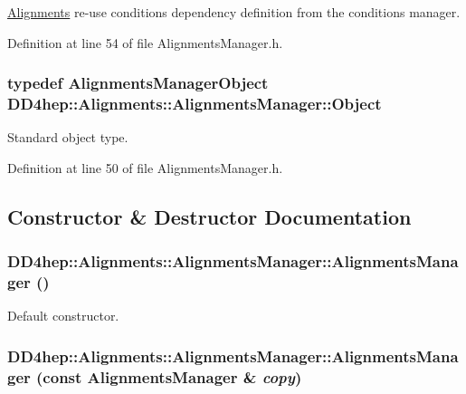 \hyperlink{namespace_d_d4hep_1_1_alignments}{Alignments} re-\/use conditions dependency definition from the conditions manager. 

Definition at line 54 of file AlignmentsManager.h.\hypertarget{class_d_d4hep_1_1_alignments_1_1_alignments_manager_a45f94880f4e49efe8e77ce6d8e45275f}{
\subsubsection[{Object}]{\setlength{\rightskip}{0pt plus 5cm}typedef {\bf AlignmentsManagerObject} {\bf DD4hep::Alignments::AlignmentsManager::Object}}}
\label{class_d_d4hep_1_1_alignments_1_1_alignments_manager_a45f94880f4e49efe8e77ce6d8e45275f}


Standard object type. 

Definition at line 50 of file AlignmentsManager.h.

\subsection{Constructor \& Destructor Documentation}
\hypertarget{class_d_d4hep_1_1_alignments_1_1_alignments_manager_af8443fac73251b70f15a609daa704858}{
\subsubsection[{AlignmentsManager}]{\setlength{\rightskip}{0pt plus 5cm}DD4hep::Alignments::AlignmentsManager::AlignmentsManager ()}}
\label{class_d_d4hep_1_1_alignments_1_1_alignments_manager_af8443fac73251b70f15a609daa704858}


Default constructor. \hypertarget{class_d_d4hep_1_1_alignments_1_1_alignments_manager_a26fc33d5bd891be859f759fc3b17c52d}{
\subsubsection[{AlignmentsManager}]{\setlength{\rightskip}{0pt plus 5cm}DD4hep::Alignments::AlignmentsManager::AlignmentsManager (const {\bf AlignmentsManager} \& {\em copy})}}
\label{class_d_d4hep_1_1_alignments_1_1_alignments_manager_a26fc33d5bd891be859f759fc3b17c52d}


